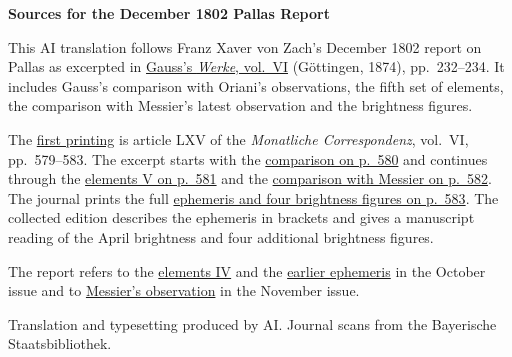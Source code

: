 \clearpage\thispagestyle{empty}
\begin{center}\textbf{Sources for the December 1802 Pallas Report}\end{center}
\noindent This AI translation follows Franz Xaver von Zach’s December 1802 report on Pallas as excerpted in \href{https://gdz.sub.uni-goettingen.de/id/PPN236007467}{Gauss’s \textit{Werke}, vol.~VI} (Göttingen, 1874), pp.~232--234. It includes Gauss’s comparison with Oriani’s observations, the fifth set of elements, the comparison with Messier’s latest observation and the brightness figures.
\par\smallskip\noindent The \href{https://api.digitale-sammlungen.de/iiif/image/v2/bsb10538598_00593/full/1450,/0/default.jpg}{first printing} is article LXV of the \textit{Monatliche Correspondenz}, vol.~VI, pp.~579--583. The excerpt starts with the \href{https://api.digitale-sammlungen.de/iiif/image/v2/bsb10538598_00594/full/1450,/0/default.jpg}{comparison on p.~580} and continues through the \href{https://api.digitale-sammlungen.de/iiif/image/v2/bsb10538598_00595/full/1450,/0/default.jpg}{elements V on p.~581} and the \href{https://api.digitale-sammlungen.de/iiif/image/v2/bsb10538598_00596/full/1450,/0/default.jpg}{comparison with Messier on p.~582}. The journal prints the full \href{https://api.digitale-sammlungen.de/iiif/image/v2/bsb10538598_00597/full/1450,/0/default.jpg}{ephemeris and four brightness figures on p.~583}. The collected edition describes the ephemeris in brackets and gives a manuscript reading of the April brightness and four additional brightness figures.
\par\smallskip\noindent The report refers to the \href{https://api.digitale-sammlungen.de/iiif/image/v2/bsb10538598_00404/full/1450,/0/default.jpg}{elements IV} and the \href{https://api.digitale-sammlungen.de/iiif/image/v2/bsb10538598_00405/full/1450,/0/default.jpg}{earlier ephemeris} in the October issue and to \href{https://api.digitale-sammlungen.de/iiif/image/v2/bsb10538598_00516/full/1450,/0/default.jpg}{Messier’s observation} in the November issue.
\par\smallskip\noindent Translation and typesetting produced by AI. Journal scans from the Bayerische Staatsbibliothek.
\clearpage

